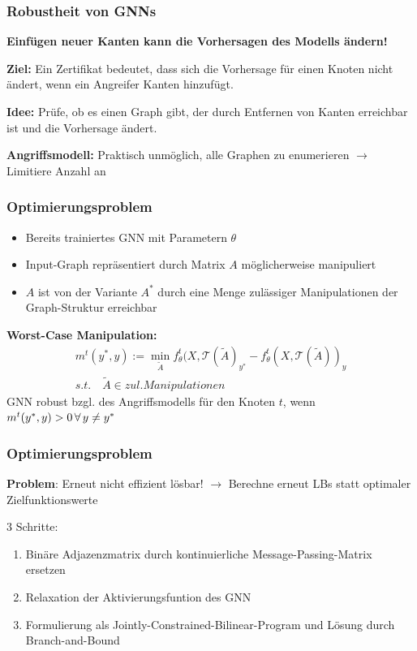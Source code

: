 \documentclass{beamer}
\begin{document}
\begin{frame}
  \frametitle{Robustheit von GNNs}

  \textbf{Einfügen neuer Kanten kann die Vorhersagen des Modells ändern!}

  \textbf{Ziel:} Ein Zertifikat bedeutet, dass sich die Vorhersage für einen Knoten
  nicht ändert, wenn ein Angreifer Kanten hinzufügt.

  \textbf{Idee:} Prüfe, ob es einen Graph gibt, der durch Entfernen von Kanten erreichbar ist und die Vorhersage ändert.

  \textbf{Angriffsmodell:} Praktisch unmöglich, alle Graphen zu enumerieren $\rightarrow$ Limitiere Anzahl an   
\end{frame}

\begin{frame}
  \frametitle{Optimierungsproblem}
  \begin{itemize}
    \item Bereits trainiertes GNN mit Parametern $\theta$
    \item Input-Graph repräsentiert durch Matrix $A$ möglicherweise manipuliert
    \item $A$ ist von der  Variante $A^{\ast}$ durch eine Menge zulässiger Manipulationen der Graph-Struktur erreichbar
  \end{itemize}
  \textbf{Worst-Case Manipulation:}
  \begin{gather}
    m^t (y^*, y) := \min_{\tilde{A}} f_{\theta}^t(X, \mathcal{T}(\tilde{A})_{y^*} - f_{\theta}^t(X, \mathcal{T}(\tilde{A}))_y \nonumber \\
    s.t. \quad \tilde{A} \in zul. Manipulationen \nonumber
\end{gather}
  GNN robust bzgl. des Angriffsmodells für den Knoten $t$, wenn $m^t (y^*, y) > 0 \thinspace \forall \thinspace y \neq y^{\ast}$
\end{frame}

\begin{frame}
  \frametitle{Optimierungsproblem}
  \textbf{Problem}: Erneut nicht effizient lösbar!\newline
  $\rightarrow$ Berechne erneut LBs statt optimaler Zielfunktionswerte\newline

  $3$ Schritte:
  \begin{enumerate}
    \item Binäre Adjazenzmatrix durch kontinuierliche Message-Passing-Matrix ersetzen
    \item Relaxation der Aktivierungsfuntion des GNN
    \item Formulierung als Jointly-Constrained-Bilinear-Program und Lösung durch Branch-and-Bound
  \end{enumerate}
\end{frame}
\end{document}

